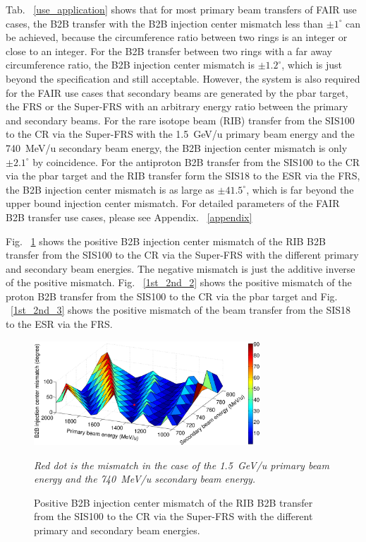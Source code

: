Tab. ~\ref{use_application} shows that for most primary beam transfers of FAIR use cases, the B2B transfer with the B2B injection center mismatch less than $\pm1^\circ$ can be achieved, because the circumference ratio between two rings is an integer or close to an integer. For the B2B transfer between two rings with a far away circumference ratio, the B2B injection center mismatch is $\pm1.2^\circ$, which is just beyond the specification and still acceptable. However, the system is also required for the FAIR use cases that secondary beams are generated by the pbar target, the FRS or the Super-FRS with an arbitrary energy ratio between the primary and secondary beams. For the rare isotope beam (RIB) transfer from the SIS100 to the CR via the Super-FRS with the \SI{1.5}{GeV/u} primary beam energy and the \SI{740}{MeV/u} secondary beam energy, the B2B injection center mismatch is only $\pm2.1^\circ$ by coincidence. For the antiproton B2B transfer from the SIS100 to the CR via the pbar target and the RIB transfer form the SIS18 to the ESR via the FRS, the B2B injection center mismatch is as large as $\pm41.5^\circ$, which is far beyond the upper bound injection center mismatch. For detailed parameters of the FAIR B2B transfer use cases, please see Appendix. ~\ref{appendix}


Fig. ~\ref{1st_2nd_1} shows the positive B2B injection center mismatch of the RIB B2B transfer from the SIS100 to the CR via the Super-FRS with the different primary and secondary beam energies. The negative mismatch is just the additive inverse of the positive mismatch. Fig. ~\ref{1st_2nd_2} shows the positive mismatch of the proton B2B transfer from the SIS100 to the CR via the pbar target and Fig. ~\ref{1st_2nd_3} shows the positive mismatch of the beam transfer from the SIS18 to the ESR via the FRS. 

\begin{figure}[!htb]
   \centering   
   \includegraphics*[width=85mm]{RIB100CR.eps}
   \caption{Positive B2B injection center mismatch of the RIB B2B transfer from the SIS100 to the CR via the Super-FRS with the different primary and secondary beam energies.}{\textsl{\small{Red dot is the mismatch in the case of the \SI{1.5}{GeV/u} primary beam energy and the \SI{740}{MeV/u} secondary beam energy.}}}
   \label{1st_2nd_1}
\end{figure} 

